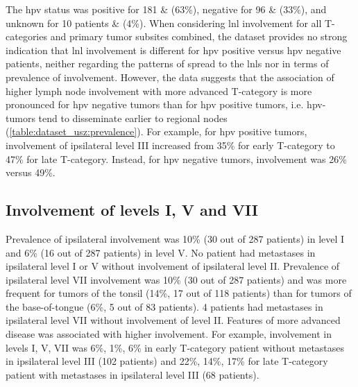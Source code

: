 \documentclass[\relativeRoot/main.tex]{subfiles}
\begin{document}
The \gls{hpv} status was positive for 181 \& (63\%), negative for 96 \& (33\%), and unknown for 10 patients \& (4\%). When considering \gls{lnl} involvement for all T-categories and primary tumor subsites combined, the dataset provides no strong indication that \gls{lnl} involvement is different for \gls{hpv} positive versus \gls{hpv} negative patients, neither regarding the patterns of spread to the \glspl{lnl} nor in terms of prevalence of involvement. However, the data suggests that the association of higher lymph node involvement with more advanced T-category is more pronounced for \gls{hpv} negative tumors than for \gls{hpv} positive tumors, i.e. \gls{hpv}-tumors tend to disseminate earlier to regional nodes (\cref{table:dataset_usz:prevalence}). For example, for \gls{hpv} positive tumors, involvement of ipsilateral level III increased from 35\% for early T-category to 47\% for late T-category. Instead, for \gls{hpv} negative tumors, involvement was 26\% versus 49\%.

\subsection*{Involvement of levels I, V and VII}

Prevalence of ipsilateral involvement was 10\% (30 out of 287 patients) in level I and 6\% (16 out of 287 patients) in level V. No patient had metastases in ipsilateral level I or V without involvement of ipsilateral level II. Prevalence of ipsilateral level VII involvement was 10\% (30 out of 287 patients) and was more frequent for tumors of the tonsil (14\%, 17 out of 118 patients) than for tumors of the base-of-tongue (6\%, 5 out of 83 patients). 4 patients had metastases in ipsilateral level VII without involvement of level II. Features of more advanced disease was associated with higher involvement. For example, involvement in levels I, V, VII was 6\%, 1\%, 6\% in early T-category patient without metastases in ipsilateral level III (102 patients) and 22\%, 14\%, 17\% for late T-category patient with metastases in ipsilateral level III (68 patients).
\end{document}

